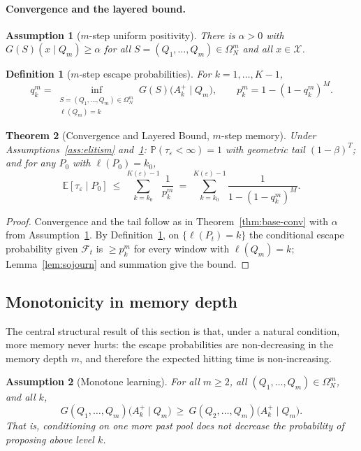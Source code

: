 \documentclass[11pt,a4paper]{article}
\newtheorem{theorem}{Theorem}[section]
\newtheorem{definition}[theorem]{Definition}
\newtheorem{assumption}{Assumption}   %
\newcommand{\X}{\mathcal{X}}
\newcommand{\Omn}{\Omega_N}
\newcommand{\calF}{\mathcal{F}}
\newcommand{\E}{\mathbb{E}}
\newcommand{\Prob}{\mathbb{P}}
\newcommand{\Akp}{A_k^{+}}
\begin{document}
\paragraph{Convergence and the layered bound.}

\begin{assumption}[$m$-step uniform positivity]\label{ass:m-pos}
  There is $\alpha>0$ with $G(S)(x\mid Q_m)\ge\alpha$ for all
  $S=(Q_1,\dots,Q_m)\in\Omn^m$ and all $x\in\X$.
\end{assumption}

\begin{definition}[$m$-step escape probabilities]\label{def:m-qk}
  For $k=1,\dots,K-1$,
  \[
    q_k^m=\inf_{\substack{S=(Q_1,\dots,Q_m)\in\Omn^m\\\ell(Q_m)=k}}
          G(S)\!\bigl(\Akp\mid Q_m\bigr),
    \qquad
    p_k^m=1-(1-q_k^m)^M .
  \]
\end{definition}

\begin{theorem}[Convergence and Layered Bound, $m$-step memory]
\label{thm:m-htb}
  Under Assumptions~\ref{ass:elitism} and~\ref{ass:m-pos}:
  $\Prob(\tau_\varepsilon<\infty)=1$ with geometric tail
  $(1-\beta)^T$; and for any $P_0$ with $\ell(P_0)=k_0$,
  \[
    \E[\tau_\varepsilon\mid P_0]
    \ \le\ \sum_{k=k_0}^{K(\varepsilon)-1}\frac1{p_k^m}
    \ =\ \sum_{k=k_0}^{K(\varepsilon)-1}\frac1{1-(1-q_k^m)^M}.
  \]
\end{theorem}

\begin{proof}
  Convergence and the tail follow as in Theorem~\ref{thm:base-conv} with
  $\alpha$ from Assumption~\ref{ass:m-pos}.  By
  Definition~\ref{def:m-qk}, on $\{\ell(P_t)=k\}$ the conditional escape
  probability given $\calF_t$ is $\ge p_k^m$ for every window with
  $\ell(Q_m)=k$; Lemma~\ref{lem:sojourn} and summation give the bound.
\end{proof}

\subsection{Monotonicity in memory depth}

The central structural result of this section is that, under a natural
condition, more memory never hurts: the escape probabilities are
non-decreasing in the memory depth $m$, and therefore the expected hitting
time is non-increasing.

\begin{assumption}[Monotone learning]\label{ass:mono}
  For all $m\ge2$, all $(Q_1,\dots,Q_m)\in\Omn^m$, and all $k$,
  \[
    G(Q_1,\dots,Q_m)\!\bigl(\Akp\mid Q_m\bigr)
    \ \ge\
    G(Q_2,\dots,Q_m)\!\bigl(\Akp\mid Q_m\bigr).
  \]
  That is, conditioning on one more past pool does not decrease the
  probability of proposing above level $k$.
\end{assumption}
\end{document}
